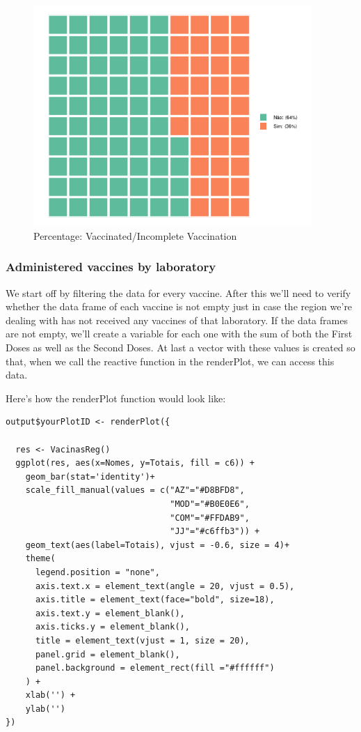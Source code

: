 \begin{figure}[H]
\centering
\includegraphics[width=300pt,trim=10 0 0 -10mm]{images/graficomapa2.png}
\caption{Percentage: Vaccinated/Incomplete Vaccination}
\label{fig:diagrama2}
\end{figure}

\subsubsection{Administered vaccines by laboratory}

We start off by filtering the data for every vaccine. After this we'll need to verify whether the data frame of each vaccine is not empty just in case the region we're dealing with has not received any vaccines of that laboratory. If the data frames are not empty, we'll create a variable for each one with the sum of both the First Doses as well as the Second Doses. At last a vector with these values is created so that, when we call the reactive function in the renderPlot, we can access this data.

Here's how the renderPlot function would look like:

\begin{verbatim}
output$yourPlotID <- renderPlot({
  
  res <- VacinasReg()
  ggplot(res, aes(x=Nomes, y=Totais, fill = c6)) + 
    geom_bar(stat='identity')+ 
    scale_fill_manual(values = c("AZ"="#D8BFD8",
                                 "MOD"="#B0E0E6",
                                 "COM"="#FFDAB9",
                                 "JJ"="#c6ffb3")) +
    geom_text(aes(label=Totais), vjust = -0.6, size = 4)+
    theme(
      legend.position = "none",
      axis.text.x = element_text(angle = 20, vjust = 0.5),
      axis.title = element_text(face="bold", size=18),
      axis.text.y = element_blank(),
      axis.ticks.y = element_blank(),
      title = element_text(vjust = 1, size = 20),
      panel.grid = element_blank(),
      panel.background = element_rect(fill ="#ffffff")
    ) + 
    xlab('') +
    ylab('') 
})
\end{verbatim}

